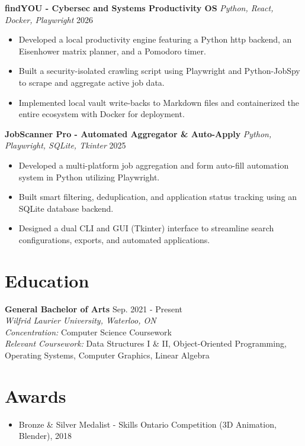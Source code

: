 \documentclass[a4paper,10pt]{article}
\begin{document}
\vspace{3pt}
\textbf{findYOU - Cybersec and Systems Productivity OS} \enspace\textbar\enspace \textit{Python, React, Docker, Playwright} \hfill 2026 \\
\begin{itemize}
    \item Developed a local productivity engine featuring a Python http backend, an Eisenhower matrix planner, and a Pomodoro timer.
    \item Built a security-isolated crawling script using Playwright and Python-JobSpy to scrape and aggregate active job data.
    \item Implemented local vault write-backs to Markdown files and containerized the entire ecosystem with Docker for deployment.
\end{itemize}

\vspace{3pt}
\textbf{JobScanner Pro - Automated Aggregator \& Auto-Apply} \enspace\textbar\enspace \textit{Python, Playwright, SQLite, Tkinter} \hfill 2025 \\
\begin{itemize}
    \item Developed a multi-platform job aggregation and form auto-fill automation system in Python utilizing Playwright.
    \item Built smart filtering, deduplication, and application status tracking using an SQLite database backend.
    \item Designed a dual CLI and GUI (Tkinter) interface to streamline search configurations, exports, and automated applications.
\end{itemize}


\section*{Education}
\textbf{General Bachelor of Arts} \hfill Sep. 2021 - Present \\
\textit{Wilfrid Laurier University, Waterloo, ON} \\
\textit{Concentration:} Computer Science Coursework \\
\textit{Relevant Coursework:} Data Structures I \& II, Object-Oriented Programming, Operating Systems, Computer Graphics, Linear Algebra

\section*{Awards}
\begin{itemize}
    \item Bronze \& Silver Medalist - Skills Ontario Competition (3D Animation, Blender), 2018
\end{itemize}
\end{document}
